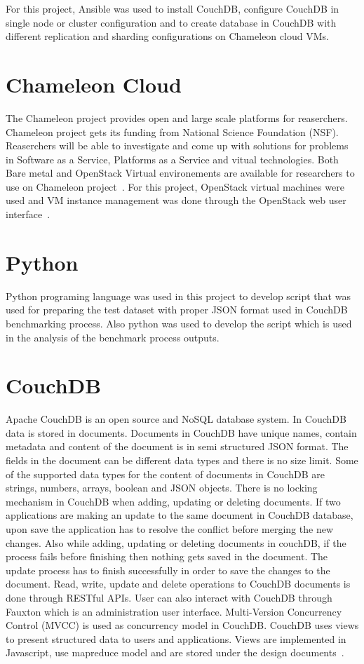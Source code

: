 For this project, Ansible was used to install CouchDB, configure
CouchDB in single node or cluster configuration and to create database
in CouchDB with different replication and sharding configurations on
Chameleon cloud VMs. 

\section{Chameleon Cloud}
The Chameleon project provides open and large scale platforms for
reaserchers. Chameleon project gets its funding from National Science
Foundation (NSF). Reaserchers will be able to investigate and come up
with solutions for problems in Software as a Service, Platforms as a
Service and vitual technologies. Both Bare metal and OpenStack Virtual
environements are available for researchers to use on Chameleon
project~\cite{www-Chameleon}. For this project, OpenStack virtual
machines were used and VM instance management was done through the
OpenStack web user interface~\cite{www-ChameleonDoc}. 

\section{Python}
Python programing language was used in this project to develop script
that was used for  preparing the test dataset with proper JSON format
used in CouchDB benchmarking process. Also python was used to develop
the script which is used in the analysis of the benchmark process outputs.

\section{CouchDB}
Apache CouchDB is an open source and NoSQL database system. In CouchDB
data is stored in documents. Documents in CouchDB have unique names, contain
metadata and content of the document is in semi structured JSON format. The fields in
the document can be different data types and there is no size
limit. Some of the supported data types for the content of documents
in CouchDB are strings, numbers, arrays, boolean and JSON
objects. There is no locking mechanism in CouchDB when adding,
updating or deleting documents. If two applications are making an
update to the same document in CouchDB database, upon save the
application has to resolve the conflict before merging the new
changes. Also while adding, updating or deleting documents in couchDB,
if the process fails before finishing then nothing gets saved in the
document. The update process has to finish successfully in order to
save the changes to the document. Read, write, update and delete
operations to CouchDB documents is done through RESTful
APIs. User can also interact with CouchDB through Fauxton which is
an administration user interface. Multi-Version Concurrency Control
(MVCC) is used as concurrency model in CouchDB. CouchDB uses views to
present structured data to users and applications. Views are
implemented in Javascript, use mapreduce model and are stored under
the design documents~\cite{www-Couchdb}. 

